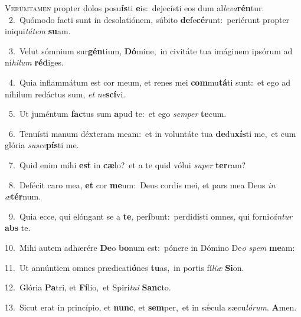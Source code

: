\lettrine{\initial\textcolor{\initialcolor}{V}}{erúmtamen} propter dolos posu\-\textbf{ís}\-ti \textbf{e}\-is:~\star dejecísti eos dum al\-\textit{le}\-\textit{va}\textbf{rén}tur.\\
{\numbfont\textcolor{\numbcolor}{~2.}}~Quómodo facti sunt in desolatiónem, súbito \textbf{de}\-fe\-\textbf{cé}\-runt:~\star periérunt propter iniqui\-\textit{tá}\-\textit{tem} \textbf{su}\-am.\par
{\numbfont\textcolor{\numbcolor}{~3.}}~Velut sómnium sur\-\textbf{gén}\-tium, \textbf{Dó}\-mine,~\star in civitáte tua imáginem ipsórum ad ní\-\textit{hi}\-\textit{lum} \textbf{réd}\-iges.\par
{\numbfont\textcolor{\numbcolor}{~4.}}~Quia inflammátum est cor meum, et renes mei \textbf{com}\-mu\-\textbf{tá}\-ti sunt:~\star et ego ad níhilum redáctus sum, \textit{et} \textit{ne}\-\textbf{scí}vi.\par
{\numbfont\textcolor{\numbcolor}{~5.}}~Ut juméntum \textbf{fac}\-tus sum \textbf{a}\-pud te:~\star et ego \textit{sem}\-\textit{per} \textbf{te}\-cum.\par
{\numbfont\textcolor{\numbcolor}{~6.}}~Tenuísti manum déxteram meam:~\dagger et in voluntáte tua \textbf{de}\-du\-\textbf{xís}\-ti me,~\star et cum glória \textit{su}\-\textit{sce}\textbf{pís}ti me.\par
{\numbfont\textcolor{\numbcolor}{~7.}}~Quid enim mihi \textbf{est} in \textbf{cæ}\-lo?~\star et a te quid vólui \textit{su}\-\textit{per} \textbf{ter}\-ram?\par
{\numbfont\textcolor{\numbcolor}{~8.}}~Defécit caro mea, \textbf{et} cor \textbf{me}\-um:~\star Deus cordis mei, et pars mea Deus \textit{in} \textit{æ}\-\textbf{tér}num.\par
{\numbfont\textcolor{\numbcolor}{~9.}}~Quia ecce, qui elóngant se a \textbf{te}\-, per\-\textbf{í}\-bunt:~\star perdidísti omnes, qui forni\-\textit{cán}\-\textit{tur} \textbf{abs} te.\par
{\numbfont\textcolor{\numbcolor}{10.}}~Mihi autem adhærére \textbf{De}\-o \textbf{bo}\-num est:~\star pónere in Dómino De\textit{o} \textit{spem} \textbf{me}\-am:\par
{\numbfont\textcolor{\numbcolor}{11.}}~Ut annúntiem omnes prædicati\-\textbf{ó}\-nes \textbf{tu}\-as,~\star in portis fí\-\textit{li}\-\textit{æ} \textbf{Si}\-on.\par
{\numbfont\textcolor{\numbcolor}{12.}}~Glória \textbf{Pa}\-tri, et \textbf{Fí}\-lio,~\star et Spirí\-\textit{tu}\-\textit{i} \textbf{Sanc}\-to.\par
{\numbfont\textcolor{\numbcolor}{13.}}~Sicut erat in princípio, et \textbf{nunc}\-, et \textbf{sem}\-per,~\star et in sǽcula sæcu\-\textit{ló}\-\textit{rum}. \textbf{A}\-men.\par
